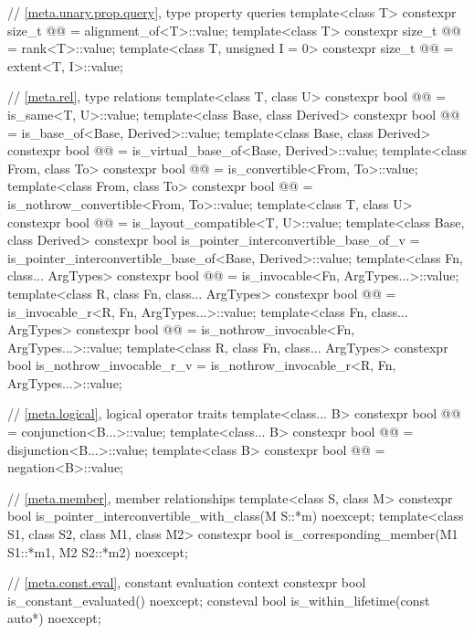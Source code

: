 \begin{codeblock}
{  // \ref{meta.unary.prop.query}, type property queries
  template<class T>
    constexpr size_t @@ = alignment_of<T>::value;
  template<class T>
    constexpr size_t @@ = rank<T>::value;
  template<class T, unsigned I = 0>
    constexpr size_t @@ = extent<T, I>::value;

  // \ref{meta.rel}, type relations
  template<class T, class U>
    constexpr bool @@ = is_same<T, U>::value;
  template<class Base, class Derived>
    constexpr bool @@ = is_base_of<Base, Derived>::value;
  template<class Base, class Derived>
    constexpr bool @@ = is_virtual_base_of<Base, Derived>::value;
  template<class From, class To>
    constexpr bool @@ = is_convertible<From, To>::value;
  template<class From, class To>
    constexpr bool @@ = is_nothrow_convertible<From, To>::value;
  template<class T, class U>
    constexpr bool @@ = is_layout_compatible<T, U>::value;
  template<class Base, class Derived>
    constexpr bool is_pointer_interconvertible_base_of_v
      = is_pointer_interconvertible_base_of<Base, Derived>::value;
  template<class Fn, class... ArgTypes>
    constexpr bool @@ = is_invocable<Fn, ArgTypes...>::value;
  template<class R, class Fn, class... ArgTypes>
    constexpr bool @@ = is_invocable_r<R, Fn, ArgTypes...>::value;
  template<class Fn, class... ArgTypes>
    constexpr bool @@ = is_nothrow_invocable<Fn, ArgTypes...>::value;
  template<class R, class Fn, class... ArgTypes>
    constexpr bool is_nothrow_invocable_r_v
      = is_nothrow_invocable_r<R, Fn, ArgTypes...>::value;

  // \ref{meta.logical}, logical operator traits
  template<class... B>
    constexpr bool @@ = conjunction<B...>::value;
  template<class... B>
    constexpr bool @@ = disjunction<B...>::value;
  template<class B>
    constexpr bool @@ = negation<B>::value;

  // \ref{meta.member}, member relationships
  template<class S, class M>
    constexpr bool is_pointer_interconvertible_with_class(M S::*m) noexcept;
  template<class S1, class S2, class M1, class M2>
    constexpr bool is_corresponding_member(M1 S1::*m1, M2 S2::*m2) noexcept;

  // \ref{meta.const.eval}, constant evaluation context
  constexpr bool is_constant_evaluated() noexcept;
  consteval bool is_within_lifetime(const auto*) noexcept;
}
\end{codeblock}

